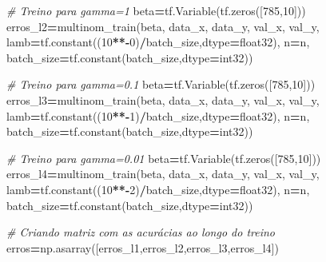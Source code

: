 \documentclass[
]{article}
\newenvironment{Shaded}{\begin{snugshade}}{\end{snugshade}}
\newcommand{\CommentTok}[1]{\textcolor[rgb]{0.56,0.35,0.01}{\textit{#1}}}
\newcommand{\DecValTok}[1]{\textcolor[rgb]{0.00,0.00,0.81}{#1}}
\newcommand{\NormalTok}[1]{#1}
\newcommand{\OperatorTok}[1]{\textcolor[rgb]{0.81,0.36,0.00}{\textbf{#1}}}
\newcommand{\StringTok}[1]{\textcolor[rgb]{0.31,0.60,0.02}{#1}}
\begin{document}
\begin{Shaded}
\begin{Highlighting}[]
\CommentTok{\# Treino para gamma=1}
\NormalTok{beta}\OperatorTok{=}\NormalTok{tf.Variable(tf.zeros([}\DecValTok{785}\NormalTok{,}\DecValTok{10}\NormalTok{]))}
\NormalTok{erros\_l2}\OperatorTok{=}\NormalTok{multinom\_train(beta,}
\NormalTok{                     data\_x,}
\NormalTok{                     data\_y,}
\NormalTok{                     val\_x,}
\NormalTok{                     val\_y,}
\NormalTok{                     lamb}\OperatorTok{=}\NormalTok{tf.constant((}\DecValTok{10}\OperatorTok{**{-}}\DecValTok{0}\NormalTok{)}\OperatorTok{/}\NormalTok{batch\_size,dtype}\OperatorTok{=}\StringTok{\textquotesingle{}float32\textquotesingle{}}\NormalTok{),}
\NormalTok{                     n}\OperatorTok{=}\NormalTok{n,}
\NormalTok{                     batch\_size}\OperatorTok{=}\NormalTok{tf.constant(batch\_size,dtype}\OperatorTok{=}\StringTok{\textquotesingle{}int32\textquotesingle{}}\NormalTok{))}

\CommentTok{\# Treino para gamma=0.1                     }
\NormalTok{beta}\OperatorTok{=}\NormalTok{tf.Variable(tf.zeros([}\DecValTok{785}\NormalTok{,}\DecValTok{10}\NormalTok{]))}
\NormalTok{erros\_l3}\OperatorTok{=}\NormalTok{multinom\_train(beta,}
\NormalTok{                     data\_x,}
\NormalTok{                     data\_y,}
\NormalTok{                     val\_x,}
\NormalTok{                     val\_y,}
\NormalTok{                     lamb}\OperatorTok{=}\NormalTok{tf.constant((}\DecValTok{10}\OperatorTok{**{-}}\DecValTok{1}\NormalTok{)}\OperatorTok{/}\NormalTok{batch\_size,dtype}\OperatorTok{=}\StringTok{\textquotesingle{}float32\textquotesingle{}}\NormalTok{),}
\NormalTok{                     n}\OperatorTok{=}\NormalTok{n,}
\NormalTok{                     batch\_size}\OperatorTok{=}\NormalTok{tf.constant(batch\_size,dtype}\OperatorTok{=}\StringTok{\textquotesingle{}int32\textquotesingle{}}\NormalTok{))}

\CommentTok{\# Treino para gamma=0.01                }
\NormalTok{beta}\OperatorTok{=}\NormalTok{tf.Variable(tf.zeros([}\DecValTok{785}\NormalTok{,}\DecValTok{10}\NormalTok{]))}
\NormalTok{erros\_l4}\OperatorTok{=}\NormalTok{multinom\_train(beta,}
\NormalTok{                     data\_x,}
\NormalTok{                     data\_y,}
\NormalTok{                     val\_x,}
\NormalTok{                     val\_y,}
\NormalTok{                     lamb}\OperatorTok{=}\NormalTok{tf.constant((}\DecValTok{10}\OperatorTok{**{-}}\DecValTok{2}\NormalTok{)}\OperatorTok{/}\NormalTok{batch\_size,dtype}\OperatorTok{=}\StringTok{\textquotesingle{}float32\textquotesingle{}}\NormalTok{),}
\NormalTok{                     n}\OperatorTok{=}\NormalTok{n,}
\NormalTok{                     batch\_size}\OperatorTok{=}\NormalTok{tf.constant(batch\_size,dtype}\OperatorTok{=}\StringTok{\textquotesingle{}int32\textquotesingle{}}\NormalTok{))}
                     
\CommentTok{\# Criando matriz com as acurácias ao longo do treino}
\NormalTok{erros}\OperatorTok{=}\NormalTok{np.asarray([erros\_l1,erros\_l2,erros\_l3,erros\_l4])}
\end{Highlighting}
\end{Shaded}
\end{document}
